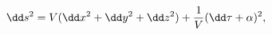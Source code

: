 \begin{equation}
\dd s^2=V(\dd x^2+\dd y^2+\dd z^2)+{1\over V}(\dd\tau +\alpha )^2,
\label{metrika}
\end{equation}

